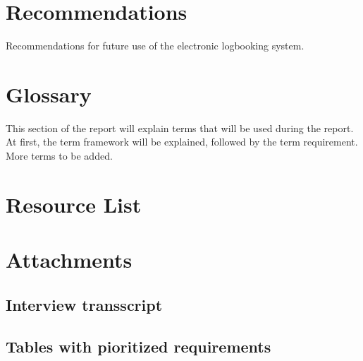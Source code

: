 \documentclass[paper=a4, fontsize=11pt,twoside]{scrartcl}	%
\begin{document}
\section{Recommendations}
Recommendations for future use of the electronic logbooking system.
\newpage

\section{Glossary}
This section of the report will explain terms that will be used during the report. At first, the term framework will be explained, followed by the term requirement. More terms to be added.
\newpage

\section{Resource List}


\newpage

\section{Attachments}

\subsection{Interview transscript}


\subsection{Tables with pioritized requirements}




\end{document}
